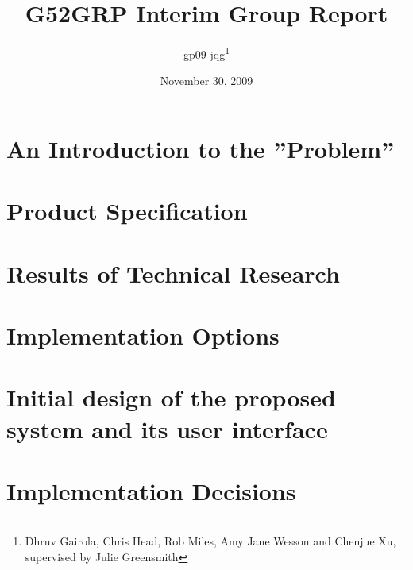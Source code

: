 \documentclass[12pt]{article}
\title{G52GRP Interim Group Report}                     %
\author{gp09-jqg\thanks{Dhruv Gairola, Chris Head, Rob Miles, Amy Jane Wesson and Chenjue Xu, supervised by Julie Greensmith}} %
\date{November 30, 2009}                                    %
\begin{document}
\maketitle                                              %

\tableofcontents
\newpage

\section{An Introduction to the ''Problem''}

\newpage

\section{Product Specification} 			%

\newpage


\section{Results of Technical Research}		%

\newpage

\section{Implementation Options}

\newpage

\section{Initial design of the proposed system and its user interface}

\newpage

\section{Implementation Decisions}

\end{document}
